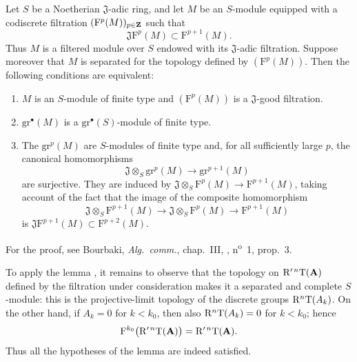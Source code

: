 \begin{lemma}[13.7.7.2]
\label{0.13.7.7.2}
Let $S$ be a Noetherian $\mathfrak{J}$-adic ring, and let $M$
be an $S$-module equipped with a codiscrete filtration
$(\mathrm{F}^p(M))_{p\in\mathbf{Z}}$ such that
\[
  \mathfrak{J}\mathrm{F}^p(M)
  \subset
  \mathrm{F}^{p+1}(M).
\]
Thus $M$ is a filtered module over $S$ endowed with its
$\mathfrak{J}$-adic filtration.
Suppose moreover that $M$ is separated for the topology defined by
$(\mathrm{F}^p(M))$.
Then the following conditions are equivalent:
\begin{enumerate}
  \item[{\rm a)}] $M$ is an $S$-module of finite type and
  $(\mathrm{F}^p(M))$ is a $\mathfrak{J}$-good filtration.
  \item[{\rm b)}] $\mathrm{gr}^\bullet(M)$ is a
  $\mathrm{gr}^\bullet(S)$-module of finite type.
  \item[{\rm c)}] The $\mathrm{gr}^p(M)$ are $S$-modules of
  finite type and, for all sufficiently large $p$, the canonical
  homomorphisms
  \begin{equation}
  \label{0.13.7.7.3}
  \tag{13.7.7.3}
    \mathfrak{J}\otimes_S\mathrm{gr}^p(M)
    \longrightarrow
    \mathrm{gr}^{p+1}(M)
  \end{equation}
  are surjective.
  They are induced by
  $\mathfrak{J}\otimes_S\mathrm{F}^p(M)
  \longrightarrow\mathrm{F}^{p+1}(M)$, taking account of the fact
  that the image of the composite homomorphism
  \[
    \mathfrak{J}\otimes_S\mathrm{F}^{p+1}(M)
    \longrightarrow
    \mathfrak{J}\otimes_S\mathrm{F}^p(M)
    \longrightarrow
    \mathrm{F}^{p+1}(M)
  \]
  is
  $\mathfrak{J}\mathrm{F}^{p+1}(M)
  \subset\mathrm{F}^{p+2}(M)$.
\end{enumerate}

For the proof, see Bourbaki, \emph{Alg.\ comm.}, chap.~III,
, n\textsuperscript{o}~1, prop.~3.
\end{lemma}

\begin{env}[13.7.7.4]
\label{0.13.7.7.4}
To apply the lemma , it remains to observe that the
topology on $\mathrm{R}'^{\,n}\mathrm{T}(\mathbf{A})$ defined by the filtration
under consideration makes it a separated and complete $S$-module:
this is the projective-limit topology of the discrete groups
$\mathrm{R}^n\mathrm{T}(A_k)$.
On the other hand, if $A_k=0$ for $k<k_0$, then also
$\mathrm{R}^n\mathrm{T}(A_k)=0$ for $k<k_0$; hence
\[
  \mathrm{F}^{k_0}\bigl(\mathrm{R}'^{\,n}\mathrm{T}(\mathbf{A})\bigr)
  =
  \mathrm{R}'^{\,n}\mathrm{T}(\mathbf{A}).
\]
Thus all the hypotheses of the lemma are indeed satisfied.
\end{env}

